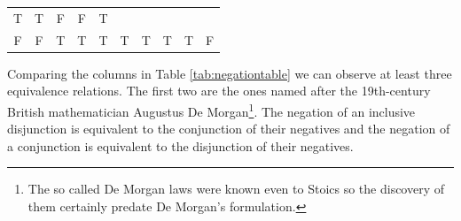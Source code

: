 \documentclass[oneside]{report}
\theoremstyle{definition}
\theoremstyle{definition}
\theoremstyle{definition}
\theoremstyle{remark}
\begin{document}
\begin{longtable}[]{@{}cccccccccc@{}}
\begin{minipage}[t]{0.08\columnwidth}
T\strut
\end{minipage} & \begin{minipage}[t]{0.08\columnwidth}\centering\strut
T\strut
\end{minipage} & \begin{minipage}[t]{0.08\columnwidth}\centering\strut
F\strut
\end{minipage} & \begin{minipage}[t]{0.09\columnwidth}\centering\strut
F\strut
\end{minipage} & \begin{minipage}[t]{0.08\columnwidth}\centering\strut
T\strut
\end{minipage}\tabularnewline
\begin{minipage}[t]{0.04\columnwidth}\centering\strut
F\strut
\end{minipage} & \begin{minipage}[t]{0.04\columnwidth}\centering\strut
F\strut
\end{minipage} & \begin{minipage}[t]{0.04\columnwidth}\centering\strut
T\strut
\end{minipage} & \begin{minipage}[t]{0.04\columnwidth}\centering\strut
T\strut
\end{minipage} & \begin{minipage}[t]{0.08\columnwidth}\centering\strut
T\strut
\end{minipage} & \begin{minipage}[t]{0.08\columnwidth}\centering\strut
T\strut
\end{minipage} & \begin{minipage}[t]{0.08\columnwidth}\centering\strut
T\strut
\end{minipage} & \begin{minipage}[t]{0.08\columnwidth}\centering\strut
T\strut
\end{minipage} & \begin{minipage}[t]{0.09\columnwidth}\centering\strut
T\strut
\end{minipage} & \begin{minipage}[t]{0.08\columnwidth}\centering\strut
F\strut
\end{minipage}\tabularnewline
\bottomrule
\end{longtable}
Comparing the columns in Table \ref{tab:negationtable} we can observe at
least three equivalence relations. The first two are the ones named
after the 19th-century British mathematician Augustus De
Morgan\footnote{The so called De Morgan laws were known even to Stoics
  so the discovery of them certainly predate De Morgan's formulation.}.
The negation of an inclusive disjunction is equivalent to the
conjunction of their negatives and the negation of a conjunction is
equivalent to the disjunction of their negatives.
\end{document}

